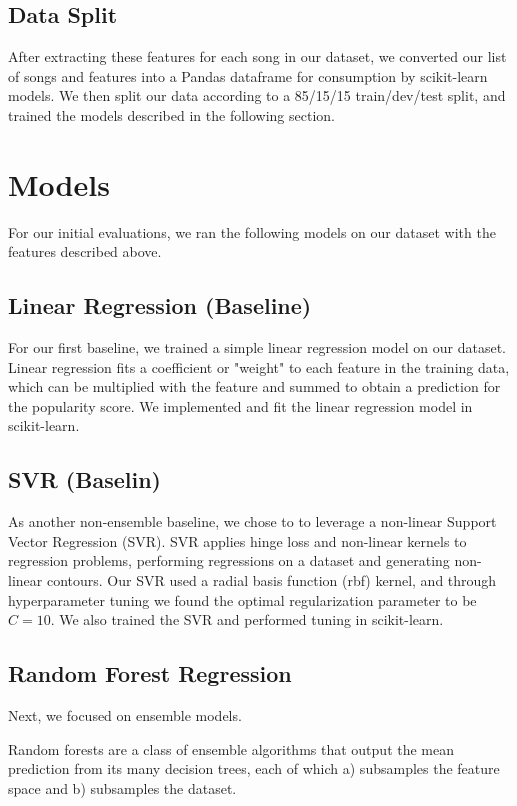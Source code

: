 \documentclass[journal]{IEEEtran}
\begin{document}
\subsection{Data Split}
After extracting these features for each song in our dataset, we converted our list of songs and features into a Pandas dataframe for consumption by scikit-learn models. We then split our data according to a 85/15/15 train/dev/test split, and trained the models described in the following section. \\


\section{Models}

For our initial evaluations, we ran the following models on our dataset with the features described above.

\subsection{Linear Regression (Baseline)}
For our first baseline, we trained a simple linear regression model on our dataset. Linear regression fits a coefficient or "weight" to each feature in the training data, which can be multiplied with the feature and summed to obtain a prediction for the popularity score. We implemented and fit the linear regression model in scikit-learn.

\subsection{SVR (Baselin)}
As another non-ensemble baseline, we chose to to leverage a non-linear Support Vector Regression (SVR). SVR applies hinge loss and non-linear kernels to regression problems, performing regressions on a dataset and generating non-linear contours. Our SVR used a radial basis function (rbf) kernel, and through hyperparameter tuning we found the optimal regularization parameter to be $C = 10$. We also trained the SVR and performed tuning in scikit-learn.

\subsection{Random Forest Regression}
Next, we focused on ensemble models.

Random forests are a class of ensemble algorithms that output the mean prediction from its many decision trees, each of which a) subsamples the feature space and b) subsamples the dataset.
\end{document}
